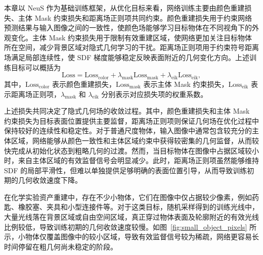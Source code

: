 本章以 NeuS 作为基础训练框架，从优化目标来看，网络训练主要由颜色重建损失、主体 Mask 约束损失和距离场正则项共同约束。颜色重建损失用于约束网络预测结果与输入图像之间的一致性，使颜色场能够学习目标物体在不同视角下的外观变化。主体 Mask 约束损失用于限制有效重建区域，使网络更加关注目标物体所在空间，减少背景区域对隐式几何学习的干扰。距离场正则项用于约束符号距离场满足局部连续性，使 SDF 梯度能够稳定反映表面附近的几何变化方向。上述训练目标可以概括为
\begin{equation}
    \text{Loss} =
    \text{Loss}_{\mathrm{color}}
    + \lambda_{\mathrm{mask}}\text{Loss}_{\mathrm{mask}}
    + \lambda_{\mathrm{eik}}\text{Loss}_{\mathrm{eik}},
\end{equation}
其中，$\text{Loss}_{\mathrm{color}}$ 表示颜色重建损失，$\text{Loss}_{\mathrm{mask}}$ 表示主体 Mask 约束损失，$\text{Loss}_{\mathrm{eik}}$ 表示距离场正则项，$\lambda_{\mathrm{mask}}$ 和 $\lambda_{\mathrm{eik}}$ 分别表示对应损失项的权重系数。

上述损失共同决定了隐式几何场的收敛过程。其中，颜色重建损失和主体 Mask 约束损失为目标表面位置提供主要监督，距离场正则项则保证几何场在优化过程中保持较好的连续性和稳定性。对于普通尺度物体，输入图像中通常包含较充分的主体区域，网络能够从颜色一致性和主体区域约束中获得较密集的几何监督，从而较快完成从初始化状态到粗略几何的过渡。然而，当目标物体在图像中占据区域较小时，来自主体区域的有效监督信号会明显减少。此时，距离场正则项虽然能够维持 SDF 的局部平滑性，但难以单独提供足够明确的表面位置引导，从而导致训练初期的几何收敛速度下降。

在化学实验资产重建中，存在不少小物体，它们在图像中仅占据较少像素，例如药匙、橡胶塞、夹具和小型连接件等。对于这类目标，随机采样得到的训练光线中，大量光线落在背景区域或自由空间区域，真正穿过物体表面及轮廓附近的有效光线比例较低，导致训练初期的几何收敛速度较慢。如图~\ref{fig:small_object_pixels} 所示，小物体仅覆盖图像中的较小区域，导致有效监督信号较为稀疏，网络更容易长时间停留在粗几何尚未稳定的阶段。



